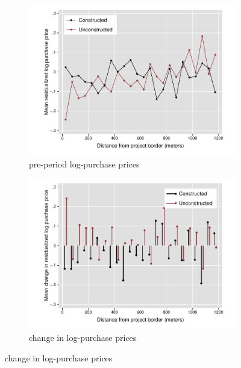 \documentclass[12pt]{article}
\begin{document}
\begin{figure}[b!]
        \centering
        \caption[ House Prices outside Constructed and Unconstructed Projects Areas ]
        {\small House Prices outside Constructed and Unconstructed projects } 
        \begin{subfigure}[b]{0.495\textwidth}
            \centering
            \includegraphics[width=\textwidth,trim={0.9cm .3cm 0.1cm 0cm}, clip=true]{figures/price_pre_means}
            \caption[Network2]%
            {{\small pre-period log-purchase prices }}    
            \label{fig:preprice}
        \end{subfigure}
        \hfill
        \begin{subfigure}[b]{0.495\textwidth}   
            \centering 
            \includegraphics[width=\textwidth,trim={0.9cm .3cm 0.1cm 0cm}, clip=true]{figures/prices_rawchanges}
            \caption[]%
            {{\small change in log-purchase prices}}    
            \label{fig:changeprice}
        \end{subfigure}
        \label{fig:rawpricemeans}
        \vspace{-6mm}
\end{figure} 
\end{document}
